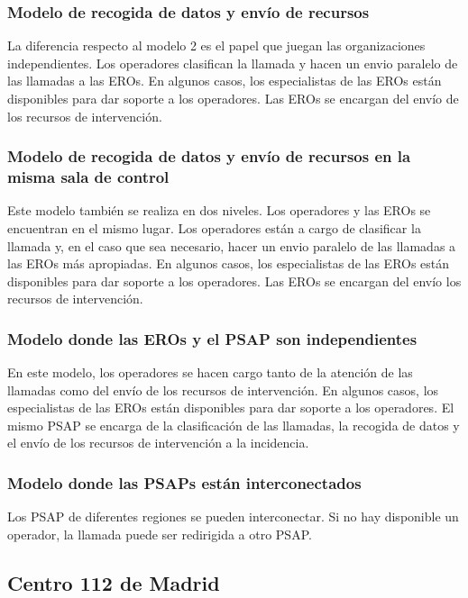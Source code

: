 \subsubsection{Modelo de recogida de datos y envío de recursos}

La diferencia respecto al modelo 2 es el papel que juegan las organizaciones independientes. Los operadores clasifican la llamada y hacen un envio paralelo de las llamadas a las EROs. En algunos casos, los especialistas de las EROs están disponibles para dar soporte a los operadores. Las EROs se encargan del envío de los recursos de intervención.

\subsubsection{Modelo de recogida de datos y envío de recursos en la misma sala de control}

Este modelo también se realiza en dos niveles. Los operadores y las EROs se encuentran en el mismo lugar. Los operadores están a cargo de clasificar la llamada y, en el caso que sea necesario, hacer un envio paralelo de las llamadas a las EROs más apropiadas. En algunos casos, los especialistas de las EROs están disponibles para dar soporte a los operadores. Las EROs se encargan del envío los recursos de intervención.

\subsubsection{Modelo donde las EROs y el PSAP son independientes}

En este modelo, los operadores se hacen cargo tanto de la atención de las llamadas como del envío de los recursos de intervención. En algunos casos, los especialistas de las EROs están disponibles para dar soporte a los operadores. El mismo PSAP se encarga de la clasificación de las llamadas, la recogida de datos y el envío de los recursos de intervención a la incidencia.

\subsubsection{Modelo donde las PSAPs están interconectados}

Los PSAP de diferentes regiones se pueden interconectar. Si no hay disponible un operador, la llamada puede ser redirigida a otro PSAP.

\subsection{Centro 112 de Madrid}

